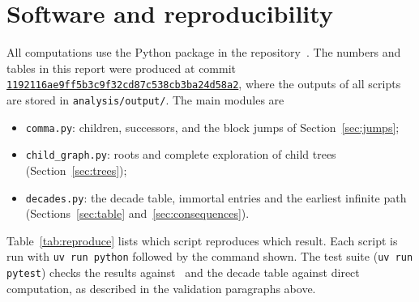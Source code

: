 \section{Software and reproducibility}
\label{app:software}

All computations use the Python package in the repository~\cite{repo}. The numbers and tables in
this report were produced at commit {\footnotesize\href{https://github.com/uhrm/kangaroo-sequence/tree/1192116ae9ff5b3c9f32cd87c538cb3ba24d58a2}{\texttt{1192116ae9ff5b3c9f32cd87c538cb3ba24d58a2}}},
where the outputs of all scripts are stored in \texttt{analysis/output/}. The main modules are
\begin{itemize}
  \item \texttt{comma.py}: children, successors, and the block jumps of Section~\ref{sec:jumps};
  \item \texttt{child\_graph.py}: roots and complete exploration of child trees
        (Section~\ref{sec:trees});
  \item \texttt{decades.py}: the decade table, immortal entries and the earliest infinite path
        (Sections~\ref{sec:table} and~\ref{sec:consequences}).
\end{itemize}
Table~\ref{tab:reproduce} lists which script reproduces which result. Each script is run with
\texttt{uv run python} followed by the command shown. The test suite (\texttt{uv run pytest})
checks the results against~\cite{comma} and the decade table against direct computation, as
described in the validation paragraphs above.

